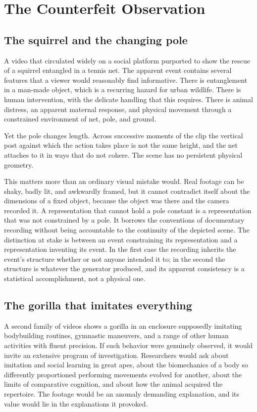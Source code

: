 \documentclass[12pt]{article}
\theoremstyle{plain}
\theoremstyle{definition}
\theoremstyle{remark}
\begin{document}
\section{The Counterfeit Observation}

\subsection{The squirrel and the changing pole}

A video that circulated widely on a social platform purported to show the rescue of a squirrel entangled in a tennis net. The apparent event contains several features that a viewer would reasonably find informative. There is entanglement in a man-made object, which is a recurring hazard for urban wildlife. There is human intervention, with the delicate handling that this requires. There is animal distress, an apparent maternal response, and physical movement through a constrained environment of net, pole, and ground.

Yet the pole changes length. Across successive moments of the clip the vertical post against which the action takes place is not the same height, and the net attaches to it in ways that do not cohere. The scene has no persistent physical geometry.

This matters more than an ordinary visual mistake would. Real footage can be shaky, badly lit, and awkwardly framed, but it cannot contradict itself about the dimensions of a fixed object, because the object was there and the camera recorded it. A representation that cannot hold a pole constant is a representation that was not constrained by a pole. It borrows the conventions of documentary recording without being accountable to the continuity of the depicted scene. The distinction at stake is between an event constraining its representation and a representation inventing its event. In the first case the recording inherits the event's structure whether or not anyone intended it to; in the second the structure is whatever the generator produced, and its apparent consistency is a statistical accomplishment, not a physical one.

\subsection{The gorilla that imitates everything}

A second family of videos shows a gorilla in an enclosure supposedly imitating bodybuilding routines, gymnastic maneuvers, and a range of other human activities with fluent precision. If such behavior were genuinely observed, it would invite an extensive program of investigation. Researchers would ask about imitation and social learning in great apes, about the biomechanics of a body so differently proportioned performing movements evolved for another, about the limits of comparative cognition, and about how the animal acquired the repertoire. The footage would be an anomaly demanding explanation, and its value would lie in the explanations it provoked.
\end{document}
